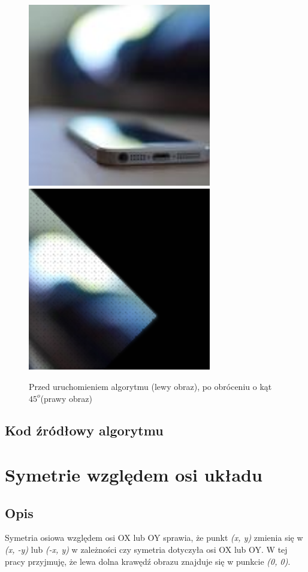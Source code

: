 \documentclass[a4paper,12pt]{book}
\begin{document}
\begin{figure}[H]
	\caption{Przed uruchomieniem algorytmu (lewy obraz), po obróceniu o kąt $45^o$(prawy obraz)}
	\includegraphics[width=8cm, height=8cm]{phone-unmodified.jpg}
	\includegraphics[width=8cm, height=8cm]{4-3/rotate-phone.png}
\end{figure}

\subsection*{Kod źródłowy algorytmu}

\section{Symetrie względem osi układu}
\subsection*{Opis}
Symetria osiowa względem osi OX lub OY sprawia, że punkt \textit{(x, y)} zmienia się w \textit{(x, -y)} lub \textit{(-x, y)} w zależności czy symetria dotyczyła osi OX lub OY. W tej pracy przyjmuję, że lewa dolna krawędź obrazu znajduje się w punkcie \textit{(0, 0)}. 
\end{document}
